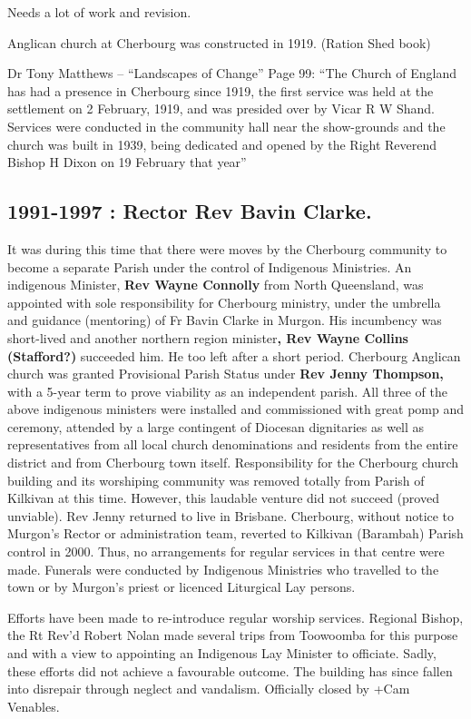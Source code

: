 Needs a lot of work and revision.

Anglican church at Cherbourg was constructed in 1919. (Ration Shed book)

Dr Tony Matthews -- ``Landscapes of Change'' Page 99: ``The Church of
England has had a presence in Cherbourg since 1919, the first service
was held at the settlement on 2 February, 1919, and was presided over by
Vicar R W Shand. Services were conducted in the community hall near the
show-grounds and the church was built in 1939, being dedicated and
opened by the Right Reverend Bishop H Dixon on 19 February that year''

\hypertarget{rector-rev-bavin-clarke.}{%
\subsection{1991-1997 : Rector Rev Bavin
Clarke.}\label{rector-rev-bavin-clarke.}}

It was during this time that there were moves by the Cherbourg community
to become a separate Parish under the control of Indigenous Ministries.
An indigenous Minister, \textbf{Rev Wayne Connolly} from North
Queensland, was appointed with sole responsibility for Cherbourg
ministry, under the umbrella and guidance (mentoring) of Fr Bavin Clarke
in Murgon. His incumbency was short-lived and another northern region
minister\textbf{, Rev Wayne Collins (Stafford?)} succeeded him. He too
left after a short period. Cherbourg Anglican church was granted
Provisional Parish Status under \textbf{Rev Jenny Thompson,} with a
5-year term to prove viability as an independent parish. All three of
the above indigenous ministers were installed and commissioned with
great pomp and ceremony, attended by a large contingent of Diocesan
dignitaries as well as representatives from all local church
denominations and residents from the entire district and from Cherbourg
town itself. Responsibility for the Cherbourg church building and its
worshiping community was removed totally from Parish of Kilkivan at this
time. However, this laudable venture did not succeed (proved unviable).
Rev Jenny returned to live in Brisbane. Cherbourg, without notice to
Murgon's Rector or administration team, reverted to Kilkivan (Barambah)
Parish control in 2000. Thus, no arrangements for regular services in
that centre were made. Funerals were conducted by Indigenous Ministries
who travelled to the town or by Murgon's priest or licenced Liturgical
Lay persons.

Efforts have been made to re-introduce regular worship services.
Regional Bishop, the Rt Rev'd Robert Nolan made several trips from
Toowoomba for this purpose and with a view to appointing an Indigenous
Lay Minister to officiate. Sadly, these efforts did not achieve a
favourable outcome. The building has since fallen into disrepair through
neglect and vandalism. Officially closed by +Cam Venables.

